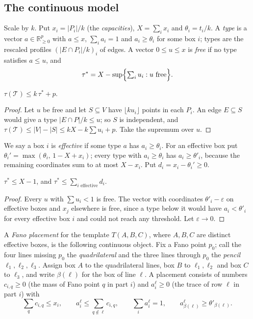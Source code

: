 \subsection{The continuous model}
Scale by $k$. Put $x_i=|P_i|/k$ (the \emph{capacities}), $X=\sum_ix_i$ and $\theta_i=t_i/k$. A \emph{type} is a vector $a\in\mathbb R^p_{\ge0}$ with $a\le x$, $\sum_ia_i=1$ and $a_i\ge\theta_i$ for some box $i$; types are the rescaled profiles $(|E\cap P_i|/k)_i$ of edges. A vector $0\le u\le x$ is \emph{free} if no type satisfies $a\le u$, and
\[
\tau^*=X-\sup\Bigl\{\textstyle\sum_iu_i: u\text{ free}\Bigr\}.
\]

\begin{lemma}\label{lem:tauint}
$\tau(\mathcal T)\le k\,\tau^*+p$.
\end{lemma}

\begin{proof}
Let $u$ be free and let $S\subseteq V$ have $\lfloor ku_i\rfloor$ points in each $P_i$. An edge $E\subseteq S$ would give a type $|E\cap P|/k\le u$; so $S$ is independent, and $\tau(\mathcal T)\le|V|-|S|\le kX-k\sum u_i+p$. Take the supremum over $u$.
\end{proof}

We say a box $i$ is \emph{effective} if some type $a$ has $a_i\ge\theta_i$. For an effective box put $\theta_i'=\max(\theta_i,\,1-X+x_i)$; every type with $a_i\ge\theta_i$ has $a_i\ge\theta'_i$, because the remaining coordinates sum to at most $X-x_i$. Put $d_i=x_i-\theta_i'\ge0$.

\begin{lemma}\label{lem:freevector}
$\tau^*\le X-1$, and $\tau^*\le\sum_{i\text{ effective}}d_i$.
\end{lemma}

\begin{proof}
Every $u$ with $\sum u_i<1$ is free. The vector with coordinates $\theta'_i-\varepsilon$ on effective boxes and $x_j$ elsewhere is free, since a type below it would have $a_i<\theta'_i$ for every effective box $i$ and could not reach any threshold. Let $\varepsilon\to0$.
\end{proof}

A \emph{Fano placement} for the template $T(A,B,C)$, where $A,B,C$ are distinct effective boxes, is the following continuous object. Fix a Fano point $p_0$; call the four lines missing $p_0$ the \emph{quadrilateral} and the three lines through $p_0$ the \emph{pencil} $\ell_1,\ell_2,\ell_3$. Assign box $A$ to the quadrilateral lines, box $B$ to $\ell_1,\ell_2$ and box $C$ to $\ell_3$, and write $\beta(\ell)$ for the box of line $\ell$. A placement consists of numbers $c_{i,q}\ge0$ (the mass of Fano point $q$ in part $i$) and $a^\ell_i\ge0$ (the trace of row $\ell$ in part $i$) with
\begin{equation}\label{eq:placement}
\sum_qc_{i,q}\le x_i,\qquad a^\ell_i\le\sum_{q\notin\ell}c_{i,q},\qquad\sum_ia^\ell_i=1,\qquad a^\ell_{\beta(\ell)}\ge\theta'_{\beta(\ell)} .
\end{equation}

